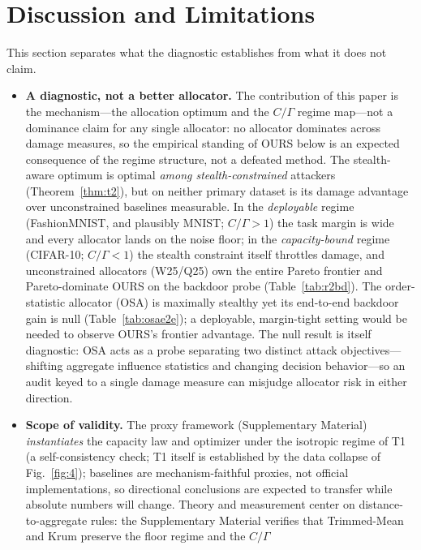 \documentclass[final,1p,times]{elsarticle}
\begin{document}
\section{Discussion and Limitations}
This section separates what the diagnostic establishes from what it
does not claim.
\begin{itemize}
  \item \textbf{A diagnostic, not a better allocator.} The contribution
  of this paper is the mechanism---the allocation optimum and the
  $C/\Gamma$ regime map---not a dominance claim for any single
  allocator: no allocator dominates across damage measures, so the
  empirical standing of OURS below is an expected consequence of the
  regime structure, not a defeated method. The stealth-aware
  optimum is optimal \emph{among stealth-constrained} attackers
  (Theorem~\ref{thm:t2}), but on neither primary dataset is its damage
  advantage over unconstrained baselines measurable. In the
  \emph{deployable} regime (FashionMNIST, and plausibly MNIST;
$C/\Gamma{>}1$) the
  task margin is wide and every allocator lands on the noise floor; in
  the \emph{capacity-bound} regime (CIFAR-10; $C/\Gamma{<}1$) the
  stealth constraint itself throttles damage, and unconstrained
  allocators (W25/Q25) own the entire Pareto frontier and
  Pareto-dominate OURS on the backdoor probe (Table~\ref{tab:r2bd}).
  The order-statistic allocator (OSA) is maximally stealthy yet its
  end-to-end backdoor gain is null (Table~\ref{tab:osae2e}); a
  deployable, margin-tight setting would be needed to observe OURS's
  frontier advantage. The null result is itself diagnostic: OSA acts as
  a probe separating two distinct attack objectives---shifting aggregate
  influence statistics and changing decision behavior---so an audit keyed
  to a single damage measure can misjudge allocator risk in either
  direction.
  \item \textbf{Scope of validity.}\label{sec:aggr-swap} The proxy
  framework (Supplementary Material) \emph{instantiates} the capacity law
  and optimizer under the isotropic regime of T1 (a self-consistency
  check; T1 itself is established by the data collapse of
  Fig.~\ref{fig:4}); baselines are mechanism-faithful proxies, not
  official implementations, so directional conclusions are expected to
  transfer while absolute numbers will change. Theory and measurement
  center on distance-to-aggregate rules: the Supplementary Material verifies that
  Trimmed-Mean and Krum preserve the floor regime and the $C/\Gamma$

\end{itemize}
\end{document}
